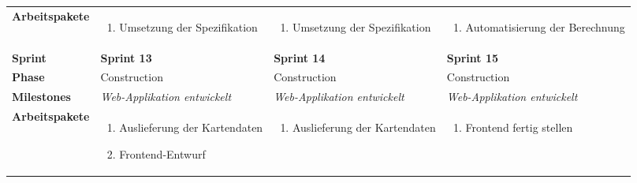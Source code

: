 \begin{landscape}
\begin{longtable}{l p{5.5cm} p{5.5cm} p{5.5cm}}
        \textbf{Arbeitspakete}
                                & \begin{enumerate}[noitemsep]
                                    \item Umsetzung der Spezifikation
                                \end{enumerate}
                                & \begin{enumerate}[noitemsep]
                                    \item Umsetzung der Spezifikation
                                \end{enumerate}
                                & \begin{enumerate}[noitemsep]
                                    \item Automatisierung der Berechnung
                                \end{enumerate} \\

        \pagebreak
        \toprule
        \textbf{Sprint}
                                & \textbf{Sprint 13}
                                & \textbf{Sprint 14}
                                & \textbf{Sprint 15}\\

        \midrule
        \textbf{Phase}
                                & Construction
                                & Construction
                                & Construction\\

        \textbf{Milestones}
                                & \textit{Web-Applikation entwickelt}
                                & \textit{Web-Applikation entwickelt}
                                & \textit{Web-Applikation entwickelt}\\

        \textbf{Arbeitspakete}
                                & \begin{enumerate}[noitemsep]
                                    \item Auslieferung der Kartendaten
                                    \item Frontend-Entwurf
                                \end{enumerate}
                                & \begin{enumerate}[noitemsep]
                                    \item Auslieferung der Kartendaten
                                \end{enumerate}
                                & \begin{enumerate}[noitemsep]
                                    \item Frontend fertig stellen
                                \end{enumerate}\\


\end{longtable}
\end{landscape}
